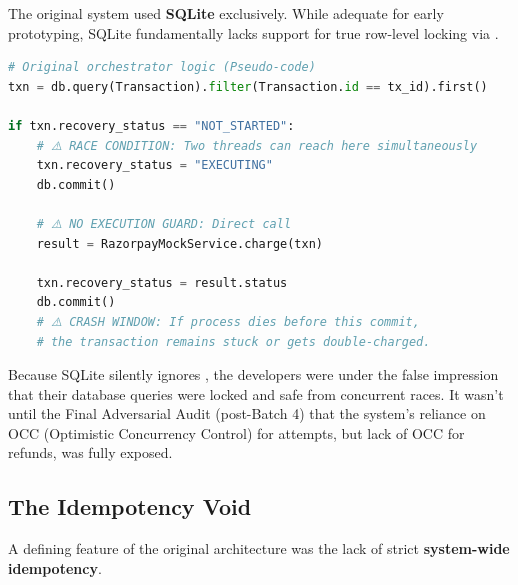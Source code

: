 The original system used \textbf{SQLite} exclusively. While adequate for early prototyping, SQLite fundamentally lacks support for true row-level locking via .

\begin{tcolorbox}[codebox={Original (Flawed) Financial Lock Implementation}]
\begin{lstlisting}[language=Python]
# Original orchestrator logic (Pseudo-code)
txn = db.query(Transaction).filter(Transaction.id == tx_id).first()

if txn.recovery_status == "NOT_STARTED":
    # ⚠️ RACE CONDITION: Two threads can reach here simultaneously
    txn.recovery_status = "EXECUTING"
    db.commit()
    
    # ⚠️ NO EXECUTION GUARD: Direct call
    result = RazorpayMockService.charge(txn)
    
    txn.recovery_status = result.status
    db.commit() 
    # ⚠️ CRASH WINDOW: If process dies before this commit, 
    # the transaction remains stuck or gets double-charged.
\end{lstlisting}
\end{tcolorbox}

Because SQLite silently ignores , the developers were under the false impression that their database queries were locked and safe from concurrent races. It wasn't until the Final Adversarial Audit (post-Batch 4) that the system's reliance on OCC (Optimistic Concurrency Control) for attempts, but lack of OCC for refunds, was fully exposed.

\vspace{0.8cm}

\subsection{The Idempotency Void}

A defining feature of the original architecture was the lack of strict \textbf{system-wide idempotency}.

